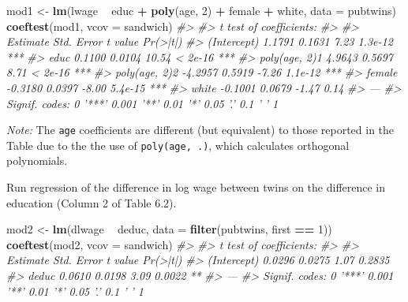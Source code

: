 \documentclass[]{book}
\newenvironment{Shaded}{\begin{snugshade}}{\end{snugshade}}
\newcommand{\KeywordTok}[1]{\textcolor[rgb]{0.13,0.29,0.53}{\textbf{#1}}}
\newcommand{\DataTypeTok}[1]{\textcolor[rgb]{0.13,0.29,0.53}{#1}}
\newcommand{\DecValTok}[1]{\textcolor[rgb]{0.00,0.00,0.81}{#1}}
\newcommand{\StringTok}[1]{\textcolor[rgb]{0.31,0.60,0.02}{#1}}
\newcommand{\CommentTok}[1]{\textcolor[rgb]{0.56,0.35,0.01}{\textit{#1}}}
\newcommand{\OperatorTok}[1]{\textcolor[rgb]{0.81,0.36,0.00}{\textbf{#1}}}
\newcommand{\NormalTok}[1]{#1}
\theoremstyle{definition}
\theoremstyle{definition}
\theoremstyle{definition}
\theoremstyle{remark}
\begin{document}
\begin{Shaded}
\begin{Highlighting}[]
\NormalTok{mod1 <-}\StringTok{ }\KeywordTok{lm}\NormalTok{(lwage }\OperatorTok{~}\StringTok{ }\NormalTok{educ }\OperatorTok{+}\StringTok{ }\KeywordTok{poly}\NormalTok{(age, }\DecValTok{2}\NormalTok{) }\OperatorTok{+}\StringTok{ }\NormalTok{female }\OperatorTok{+}\StringTok{ }\NormalTok{white, }\DataTypeTok{data =}\NormalTok{ pubtwins)}
\KeywordTok{coeftest}\NormalTok{(mod1, }\DataTypeTok{vcov =}\NormalTok{ sandwich)}
\CommentTok{#> }
\CommentTok{#> t test of coefficients:}
\CommentTok{#> }
\CommentTok{#>               Estimate Std. Error t value Pr(>|t|)    }
\CommentTok{#> (Intercept)     1.1791     0.1631    7.23  1.3e-12 ***}
\CommentTok{#> educ            0.1100     0.0104   10.54  < 2e-16 ***}
\CommentTok{#> poly(age, 2)1   4.9643     0.5697    8.71  < 2e-16 ***}
\CommentTok{#> poly(age, 2)2  -4.2957     0.5919   -7.26  1.1e-12 ***}
\CommentTok{#> female         -0.3180     0.0397   -8.00  5.4e-15 ***}
\CommentTok{#> white          -0.1001     0.0679   -1.47     0.14    }
\CommentTok{#> ---}
\CommentTok{#> Signif. codes:  0 '***' 0.001 '**' 0.01 '*' 0.05 '.' 0.1 ' ' 1}
\end{Highlighting}
\end{Shaded}

\emph{Note:} The \texttt{age} coefficients are different (but
equivalent) to those reported in the Table due to the the use of
\texttt{poly(age,\ .)}, which calculates orthogonal polynomials.

Run regression of the difference in log wage between twins on the
difference in education (Column 2 of Table 6.2).

\begin{Shaded}
\begin{Highlighting}[]
\NormalTok{mod2 <-}\StringTok{ }\KeywordTok{lm}\NormalTok{(dlwage }\OperatorTok{~}\StringTok{ }\NormalTok{deduc, }\DataTypeTok{data =} \KeywordTok{filter}\NormalTok{(pubtwins, first }\OperatorTok{==}\StringTok{ }\DecValTok{1}\NormalTok{))}
\KeywordTok{coeftest}\NormalTok{(mod2, }\DataTypeTok{vcov =}\NormalTok{ sandwich)}
\CommentTok{#> }
\CommentTok{#> t test of coefficients:}
\CommentTok{#> }
\CommentTok{#>             Estimate Std. Error t value Pr(>|t|)   }
\CommentTok{#> (Intercept)   0.0296     0.0275    1.07   0.2835   }
\CommentTok{#> deduc         0.0610     0.0198    3.09   0.0022 **}
\CommentTok{#> ---}
\CommentTok{#> Signif. codes:  0 '***' 0.001 '**' 0.01 '*' 0.05 '.' 0.1 ' ' 1}
\end{Highlighting}
\end{Shaded}
\end{document}
